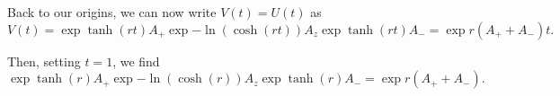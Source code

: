 \documentclass{_mypackages/monograph}
\begin{document}
Back to our origins, we can now write \(V(t)=U(t)\) as
\begin{equation}
    V(t) = \exp{\tanh(rt) A_{+}}\exp{-\ln(\cosh(rt))A_z}\exp{\tanh(rt)A_{-}} = \exp{r(A_{+} + A_{-})t}.
\end{equation}
\begin{mybox}
Then, setting \(t=1\), we find 
\begin{equation}
    \exp{\tanh(r) A_{+}}\exp{-\ln(\cosh(r))A_z}\exp{\tanh(r)A_{-}} = \exp{r(A_{+} + A_{-})}.
\end{equation}
\end{mybox}
\end{document}
